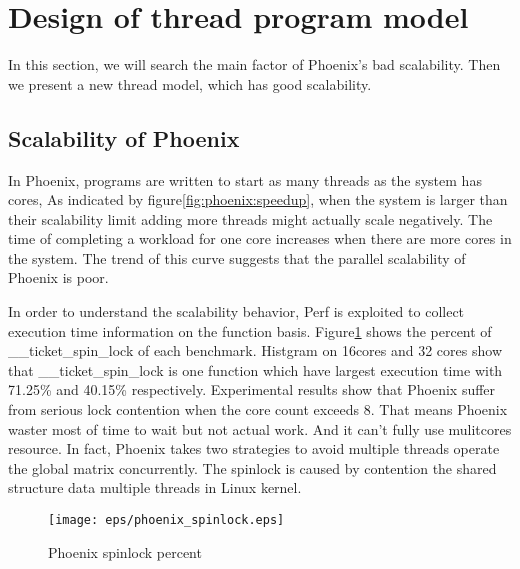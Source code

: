 \section{Design of thread program model}
{\color{red}In this section, we will search the main factor of Phoenix's bad scalability.
Then we present a new thread model, which has good scalability.
}


\subsection{Scalability of Phoenix}
In Phoenix, programs are written to start as many threads as the system has cores,
As indicated by figure\ref{fig:phoenix:speedup}, 
when the system is larger than their scalability limit 
adding more threads might actually scale negatively.
The time of completing a workload for one core increases 
when there are more cores in the system. 
The trend of this curve suggests that
the parallel scalability of Phoenix is poor.

In order to understand the scalability behavior, 
Perf\cite{} is exploited to collect execution time information
on the function basis. 
Figure\ref{fig:phoenix:spinlock} shows the percent of \_\_ticket\_spin\_lock of each benchmark.
Histgram on 16cores and 32 cores
show that \_\_ticket\_spin\_lock is one function 
which have largest execution time with 71.25\% and 40.15\% respectively. 
Experimental results show that Phoenix suffer from serious lock contention
when the core count exceeds 8.
That means Phoenix waster most of time to wait but not actual work.
And it can't fully use mulitcores resource.
In fact, Phoenix takes two strategies to avoid multiple threads operate the global matrix concurrently.
The spinlock is caused by contention the shared structure data multiple threads in Linux kernel.
\begin{figure}[!h!t]  
    \centering
    \texttt{[image: eps/phoenix\_spinlock.eps]}
    \caption{Phoenix spinlock percent}
    \label{fig:phoenix:spinlock}
\end{figure}


